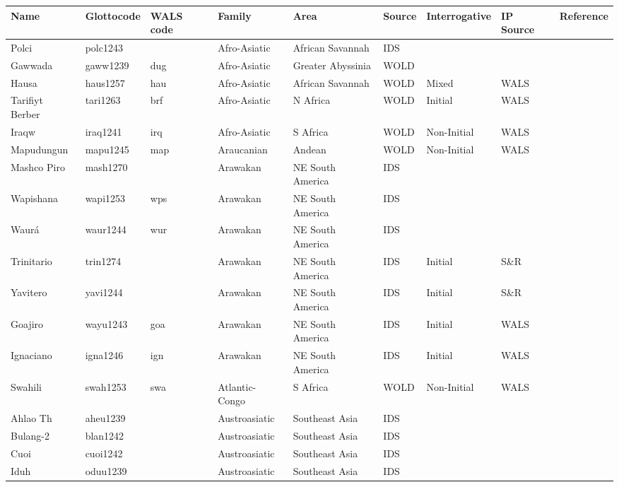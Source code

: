 \centering
\begin{longtable}{lllllllll}
  \hline
Name & Glottocode & WALS code & Family & Area & Source & Interrogative & IP Source & Reference \\ 
  \hline
Polci & polc1243 &  & Afro-Asiatic & African Savannah & IDS &  &  &  \\ 
  Gawwada & gaww1239 & dug & Afro-Asiatic & Greater Abyssinia & WOLD &  &  &  \\ 
  Hausa & haus1257 & hau & Afro-Asiatic & African Savannah & WOLD & Mixed & WALS &  \\ 
  Tarifiyt Berber & tari1263 & brf & Afro-Asiatic & N Africa & WOLD & Initial & WALS &  \\ 
  Iraqw & iraq1241 & irq & Afro-Asiatic & S Africa & WOLD & Non-Initial & WALS &  \\ 
  Mapudungun & mapu1245 & map & Araucanian & Andean & WOLD & Non-Initial & WALS &  \\ 
  Mashco Piro & mash1270 &  & Arawakan & NE South America & IDS &  &  &  \\ 
  Wapishana & wapi1253 & wps & Arawakan & NE South America & IDS &  &  &  \\ 
  Waurá & waur1244 & wur & Arawakan & NE South America & IDS &  &  &  \\ 
  Trinitario & trin1274 &  & Arawakan & NE South America & IDS & Initial & S\&R & \cite[91]{rose_trinitario2014.pdf} \\ 
  Yavitero & yavi1244 &  & Arawakan & NE South America & IDS & Initial & S\&R & \cite[638]{mosonyietal_yavitero2000.pdf}\cite[79...]{mosonyi_yavitero1987.pdf} \\ 
  Goajiro & wayu1243 & goa & Arawakan & NE South America & IDS & Initial & WALS &  \\ 
  Ignaciano & igna1246 & ign & Arawakan & NE South America & IDS & Initial & WALS &  \\ 
  Swahili & swah1253 & swa & Atlantic-Congo & S Africa & WOLD & Non-Initial & WALS &  \\ 
  Ahlao Th & aheu1239 &  & Austroasiatic & Southeast Asia & IDS &  &  &  \\ 
  Bulang-2 & blan1242 &  & Austroasiatic & Southeast Asia & IDS &  &  &  \\ 
  Cuoi & cuoi1242 &  & Austroasiatic & Southeast Asia & IDS &  &  &  \\ 
  Iduh & oduu1239 &  & Austroasiatic & Southeast Asia & IDS &  &  &  \\ 

\end{longtable}
